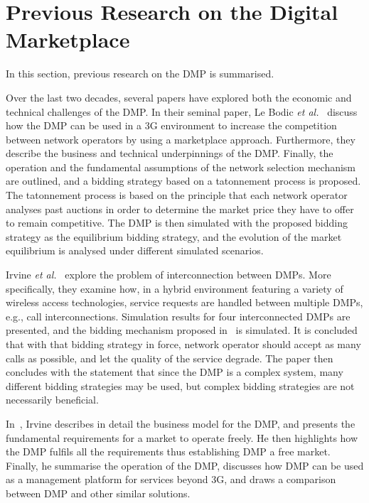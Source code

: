 \section{Previous Research on the Digital Marketplace} %
\label{sec:previous_research_on_the_digital_marketplace_dmp}
In this section, previous research on the DMP is summarised.

Over the last two decades, several papers have explored both the economic and technical challenges of the DMP. In their seminal paper, Le Bodic \emph{et al.}~\cite{DMLeBodic00} discuss how the DMP can be used in a 3G environment to increase the competition between network operators by using a marketplace approach. Furthermore, they describe the business and technical underpinnings of the DMP. Finally, the operation and the fundamental assumptions of the network selection mechanism are outlined, and a bidding strategy based on a tatonnement process is proposed. The tatonnement process is based on the principle that each network operator analyses past auctions in order to determine the market price they have to offer to remain competitive. The DMP is then simulated with the proposed bidding strategy as the equilibrium bidding strategy, and the evolution of the market equilibrium is analysed under different simulated scenarios. 

Irvine \emph{et al.}~\cite{DMIrvine01} explore the problem of interconnection between DMPs. More specifically, they examine how, in a hybrid environment featuring a variety of wireless access technologies, service requests are handled between multiple DMPs, e.g., call interconnections. Simulation results for four interconnected DMPs are presented, and the bidding mechanism proposed in~\cite{DMLeBodic00} is simulated. It is concluded that with that bidding strategy in force, network operator should accept as many calls as possible, and let the quality of the service degrade. The paper then concludes with the statement that since the DMP is a complex system, many different bidding strategies may be used, but complex bidding strategies are not necessarily beneficial.

In~\cite{DMIrvine02}, Irvine describes in detail the business model for the DMP, and presents the fundamental requirements for a market to operate freely. He then highlights how the DMP fulfils all the requirements thus establishing DMP a free market. Finally, he summarise the operation of the DMP, discusses how DMP can be used as a management platform for services beyond 3G, and draws a comparison between DMP and other similar solutions.

